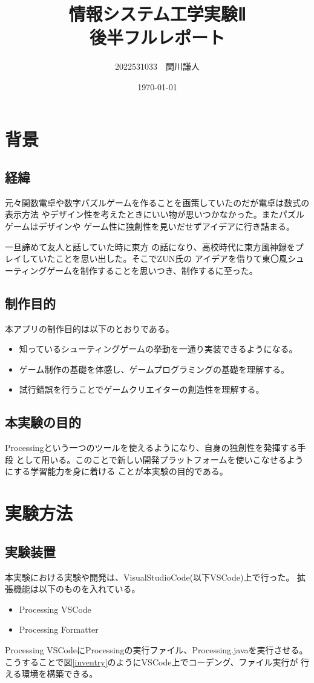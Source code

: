 \documentclass[a4paper,titlepage,11pt]{ltjsarticle}
\begin{document}
\title{情報システム工学実験Ⅱ \\後半フルレポート}
\author{2022531033　関川謙人}
\date{\today}
\maketitle
\tableofcontents
\clearpage
\section{背景}
\subsection{経緯}
元々関数電卓や数字パズルゲームを作ることを画策していたのだが電卓は数式の表示方法
やデザイン性を考えたときにいい物が思いつかなかった。またパズルゲームはデザインや
ゲーム性に独創性を見いだせずアイデアに行き詰まる。

一旦諦めて友人と話していた時に東方
の話になり、高校時代に東方風神録をプレイしていたことを思い出した。そこでZUN氏の
アイデアを借りて東〇風シューティングゲームを制作することを思いつき、制作するに至った。
\subsection{制作目的}
本アプリの制作目的は以下のとおりである。
\begin{itemize}
	\item 知っているシューティングゲームの挙動を一通り実装できるようになる。
	\item ゲーム制作の基礎を体感し、ゲームプログラミングの基礎を理解する。
	\item 試行錯誤を行うことでゲームクリエイターの創造性を理解する。
\end{itemize}
\subsection{本実験の目的}
Processingという一つのツールを使えるようになり、自身の独創性を発揮する手段
として用いる。このことで新しい開発プラットフォームを使いこなせるようにする学習能力を身に着ける
ことが本実験の目的である。
\section{実験方法}
\subsection{実験装置}
本実験における実験や開発は、VisualStudioCode(以下VSCode)上で行った。
拡張機能は以下のものを入れている。
\begin{itemize}
	\item Processing VSCode
	\item Processing Formatter
\end{itemize}
Processing VSCodeにProcessingの実行ファイル、Processing.javaを実行させる。
こうすることで図\ref{inventry}のようにVSCode上でコーデング、ファイル実行が
行える環境を構築できる。
\end{document}
